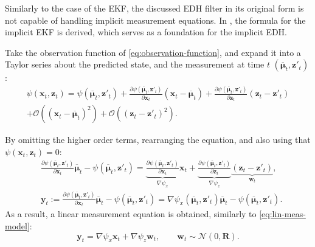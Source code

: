 Similarly to the case of the EKF, the discussed EDH filter in its original form is not capable of
handling implicit measurement equations.
In \cite{Zhang2012}, the formula for the implicit EKF is derived,
which serves as a foundation for the implicit EDH.

Take the observation function of \eqref{eq:observation-function},
and expand it into a Taylor series about the predicted state, and the measurement at time $t$ $\left(\overline{\boldsymbol\mu}_t,\mathbf{z}'_t\right)$:
\begin{align}
    \psi(\mathbf{x}_t,\mathbf{z}_t) = \psi(\overline{\boldsymbol\mu}_t,\mathbf{z}'_t)
    + \frac{\partial \psi(\overline{\boldsymbol\mu}_t,\mathbf{z}'_t)}{\partial \mathbf{x}_t}(\mathbf{x}_t-\overline{\boldsymbol\mu}_t)
    + \frac{\partial \psi(\overline{\boldsymbol\mu}_t,\mathbf{z}'_t)}{\partial \mathbf{z}_t}(\mathbf{z}_t-\mathbf{z}'_t) \\
    + \mathcal{O}((\mathbf{x}_t-\overline{\boldsymbol\mu}_t)^2)
    + \mathcal{O}((\mathbf{z}_t-\mathbf{z}'_t)^2) \nonumber.
\end{align}

By omitting the higher order terms, rearranging the equation, and also using that \linebreak
$\psi(\mathbf{x}_t,\mathbf{z}_t) = 0$:
\begin{align}
     & \frac{\partial \psi(\overline{\boldsymbol\mu}_t,\mathbf{z}'_t)}{\partial \mathbf{x}_t}\overline{\boldsymbol\mu}_t
    - \psi(\overline{\boldsymbol\mu}_t,\mathbf{z}'_t) = \underbrace{\frac{\partial \psi(\overline{\boldsymbol\mu}_t,\mathbf{z}'_t)}{\partial \mathbf{x}_t}}_{\nabla \psi_x}\mathbf{x}_t + \underbrace{\frac{\partial \psi(\overline{\boldsymbol\mu}_t,\mathbf{z}'_t)}{\partial \mathbf{z}_t}}_{\nabla \psi_z}\underbrace{(\mathbf{z}_t-\mathbf{z}'_t)}_{\mathbf{w}_t}, \\
     & \mathbf{y}_t :=  \frac{\partial \psi(\overline{\boldsymbol\mu}_t,\mathbf{z}'_t)}{\partial \mathbf{x}_t}\overline{\boldsymbol\mu}_t
    - \psi(\overline{\boldsymbol\mu}_t,\mathbf{z}'_t) = \nabla\psi_x(\overline{\boldsymbol\mu}_t,\mathbf{z}'_t)\overline{\boldsymbol\mu}_t-\psi(\overline{\boldsymbol\mu}_t,\mathbf{z}'_t) \label{eq:edh-implicit-y}.
\end{align}
As a result, a linear measurement equation is obtained, similarly to \eqref{eq:lin-meas-model}:
\begin{equation}
    \mathbf{y}_t = \nabla \psi_x \mathbf{x}_t + \nabla \psi_z\mathbf{w}_t,\quad\quad \mathbf{w}_t \sim \mathcal{N}(0,\mathbf{R}).
\end{equation}

